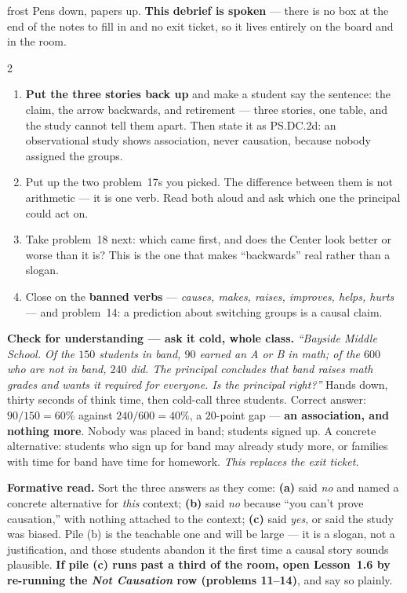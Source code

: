 \documentclass[10pt]{article}
\begin{document}
\boxguard[24]
\begin{skillbox}{frost}
Pens down, papers up. \textbf{This debrief is spoken} --- there is no box at the end of the
notes to fill in and no exit ticket, so it lives entirely on the board and in the room.
\begin{multicols}{2}
\begin{enumerate}[leftmargin=1.3em, nosep, itemsep=3pt]
  \item \textbf{Put the three stories back up} and make a student say the sentence: the claim,
        the arrow backwards, and retirement --- three stories, one table, and the study cannot
        tell them apart. Then state it as PS.DC.2d: an observational study shows association,
        never causation, because nobody assigned the groups.
  \item Put up the two problem~17s you picked. The difference between them is not arithmetic
        --- it is one verb. Read both aloud and ask which one the principal could act on.
  \item Take problem~18 next: which came first, and does the Center look better or worse than
        it is? This is the one that makes ``backwards'' real rather than a slogan.
  \item Close on the \textbf{banned verbs} --- \emph{causes, makes, raises, improves, helps,
        hurts} --- and problem~14: a prediction about switching groups is a causal claim.
\end{enumerate}
\columnbreak
\textbf{Check for understanding --- ask it cold, whole class.} \emph{``Bayside Middle School.
Of the $150$ students in band, $90$ earned an A or B in math; of the $600$ who are not in band,
$240$ did. The principal concludes that band \emph{raises} math grades and wants it required
for everyone. Is the principal right?''} Hands down, thirty seconds of think time, then
cold-call three students. Correct answer: $90/150 = 60\%$ against $240/600 = 40\%$, a
$20$-point gap --- \textbf{an association, and nothing more}. Nobody was placed in band;
students signed up. A concrete alternative: students who sign up for band may already study
more, or families with time for band have time for homework. \emph{This replaces the exit
ticket.}

\textbf{Formative read.} Sort the three answers as they come: \textbf{(a)} said \emph{no} and
named a concrete alternative for \emph{this} context; \textbf{(b)} said \emph{no} because ``you
can't prove causation,'' with nothing attached to the context; \textbf{(c)} said \emph{yes}, or
said the study was biased. Pile (b) is the teachable one and will be large --- it is a slogan,
not a justification, and those students abandon it the first time a causal story sounds
plausible. \textbf{If pile (c) runs past a third of the room, open Lesson~1.6 by re-running the
\emph{Not Causation} row (problems 11--14)}, and say so plainly.


\end{multicols}
\end{skillbox}
\end{document}
